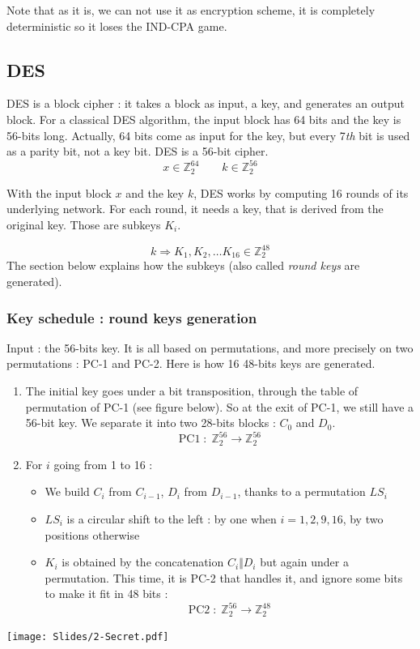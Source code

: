 \documentclass[../Cryptography.tex]{subfiles}
\begin{document}
Note that as it is, we can not use it as encryption scheme, it is completely deterministic so it loses the IND-CPA game. \\



\subsection{DES}
DES is a block cipher : it takes a block as input, a key, and generates an output block. For a classical DES algorithm, the input block has 64 bits and the key is 56-bits long. Actually, 64 bits come as input for the key, but every 7\textit{th} bit is used as a parity bit, not a key bit. DES is a 56-bit cipher. \\

$$x \in \mathbb{Z}_2 ^{64} \qquad k \in \mathbb{Z}_2 ^{56}$$

With the input block $x$ and the key $k$, DES works by computing 16 rounds of its underlying network. For each round, it needs a key, that is derived from the original key. Those are subkeys $K_i$.

$$k \Rightarrow K_1, K_2, \dots K_{16} \in \mathbb{Z}_2 ^{48}$$
The section below explains how the subkeys (also called \textit{round keys} are generated).
\subsubsection{Key schedule : round keys generation}
Input : the 56-bits key. It is all based on permutations, and more precisely on two permutations : PC-1 and PC-2. Here is how 16 48-bits keys are generated.
\begin{enumerate}
    \item The initial key goes under a bit transposition, through the table of permutation of PC-1 (see figure below). So at the exit of PC-1, we still have a 56-bit key. We separate it into two 28-bits blocks : $C_0$ and $D_0$.
    $$\mathrm{PC}1 \; : \; \mathbb{Z}_2 ^{56} \rightarrow \mathbb{Z}_2 ^{56}$$
    
    \item For $i$ going from 1 to 16 :
        \begin{itemize}
            \item We build $C_i$ from $C_{i-1}$, $D_i$ from $D_{i-1}$, thanks to a permutation $LS_i$
            \item $LS_i$ is a circular shift to the left : by one when $i=1, 2, 9, 16$, by two positions otherwise
            \item $K_i$ is obtained by the concatenation $C_i \Vert D_i$ but again under a permutation. This time, it is PC-2 that handles it, and ignore some bits to make it fit in 48 bits : 
            $$\mathrm{PC}2 \; : \; \mathbb{Z}_2 ^{56} \rightarrow \mathbb{Z}_2 ^{48}$$
        \end{itemize}
\end{enumerate}
\begin{center}
    \texttt{[image: Slides/2-Secret.pdf]}
\end{center}
\end{document}
